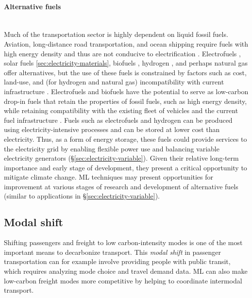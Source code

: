 \documentclass[11pt]{report}
\newcommand{\Gap}{\texorpdfstring{\hfill}{}}
\newcommand{\Longterm}{\texorpdfstring{{\small\emph{\color{OliveGreen}{\fbox{Long-term}}}}}{}}
\begin{document}
\paragraph*{Alternative fuels}\Gap \textbf{\Longterm}\mbox{}\\Much of the transportation sector is highly dependent on liquid fossil fuels. Aviation, long-distance road transportation, and ocean shipping require fuels with high energy density and thus are not conducive to electrification \cite{Daviseaas9793}. Electrofuels \cite{BRYNOLF20181887}, solar fuels \ref{sec:electricity-materials}, biofuels \cite{biofuelsIEA}, hydrogen \cite{doeHydrogen, cano2018fuelCells}, and perhaps natural gas \cite{tong2015gas} offer alternatives, but the use of these fuels is constrained by factors such as cost, land-use, and (for hydrogen and natural gas) incompatibility with current infrastructure \cite{Daviseaas9793}.  
Electrofuels and biofuels have the potential to serve as low-carbon drop-in fuels that retain the properties of fossil fuels, such as high energy density, while retaining compatibility with the existing fleet of vehicles and the current fuel infrastructure \cite{kaack2018decarbonizing}. 
Fuels such as electrofuels and hydrogen can be produced using electricity-intensive processes and can be stored at lower cost than electricity. Thus, as a form of energy storage, these fuels could provide services to the electricity grid by enabling flexible power use and balancing variable electricity generators (\S\ref{sec:electricity-variable}). Given their relative long-term importance and early stage of development, they present a critical opportunity to mitigate climate change.
ML techniques may present opportunities for improvement at various stages of research and development of alternative fuels (similar to applications in  \S\ref{sec:electricity-variable}). 


\subsection{Modal shift}\label{sec:modalshift}
Shifting passengers and freight to low carbon-intensity modes is one of the most important means to decarbonize transport. 
This \emph{modal shift} in passenger transportation can for example involve providing people with public transit, which requires analyzing mode choice and travel demand data. ML can also make low-carbon freight modes more competitive by helping to coordinate intermodal transport.
\end{document}
